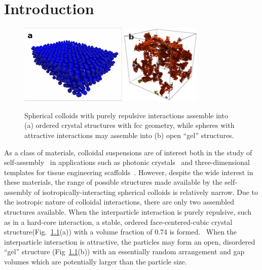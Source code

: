 \chapter{Introduction}

\begin{figure}
\begin{center}
\includegraphics[height=1.5in]{figures/literature-review/sphere-crystal.png}
\includegraphics[height=1.5in]{figures/literature-review/sphere-gel.png}
\end{center}
\caption{Spherical colloids with purely repulsive interactions assemble into (a) ordered 
crystal structures with fcc geometry, while spheres with
attractive interactions may assemble into (b) open ``gel'' structures.}

\label{fig:isotropic-structs}

\end{figure}

As a class of materials, colloidal suspensions are of interest both
in the study of self-assembly~\cite{glotzer-solomon} in applications such
as photonic crystals~\cite{vos-photonic, yang-photonic} and three-dimensional templates for tissue 
engineering scaffolds~\cite{zhang-tissue}. However, despite the wide interest in these materials, the range of possible 
structures made available by the 
self-assembly of isotropically-interacting spherical colloids is relatively narrow.  Due to the isotropic nature
of colloidal interactions, there are only two assembled structures available.
When the interparticle interaction is purely 
repulsive, such as in a hard-core interaction,  a stable, ordered face-centered-cubic crystal
structure(Fig.~\ref{fig:isotropic-structs}(a)) with a volume fraction of 0.74 is formed.~\cite{ise-crystal, wong-crystal}
When the interparticle interaction is attractive, the particles may form an open, disordered ``gel'' 
structure (Fig~\ref{fig:isotropic-structs}(b)) 
with an essentially random arrangement and gap volumes which are potentially larger than the 
particle size.~\cite{warren-gel}

